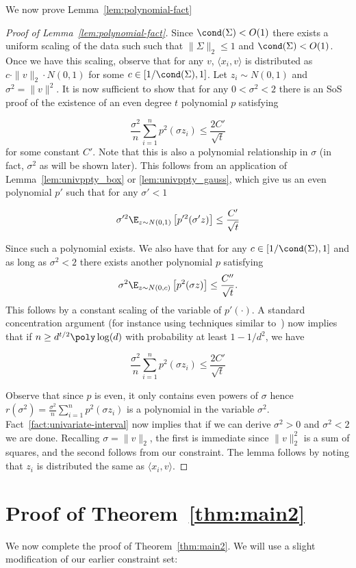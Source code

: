 We now prove Lemma~\ref{lem:polynomial-fact}
\begin{proof}[Proof of Lemma~\ref{lem:polynomial-fact}]
 Since $\cond(\Sigma) < O(1)$ there exists a uniform scaling of the data such such that $\|\Sigma\|_2 \leq 1$ and $\cond(\Sigma) < O(1)$. Once we have this scaling, observe that for any $v$, $\langle x_i, v\rangle$ is distributed as  $ c \cdot\|v\|_2 \cdot N(0, 1)$ for some $c \in [1/\cond(\Sigma), 1]$. Let $z_i \sim N(0,1)$ and $\sigma^2 = \|v\|^2$.  It is now  sufficient to show that for any $0 < \sigma^2 < 2$ there is an SoS proof of the existence of an even degree $t$ polynomial $p$ satisfying
 
 \[ \frac{\sigma^2}{n} \sum_{i=1}^n p^2(\sigma z_i) \leq \frac{2C'}{\sqrt{t}} \] 
for some constant $C'$. Note that this is also a polynomial relationship in $\sigma$ (in fact, $\sigma^2$ as will be shown later).  
This follows from an application of Lemma~\ref{lem:univppty_box} or \ref{lem:univppty_gauss}, which give us an even polynomial $p'$ such that for any $\sigma' < 1$

\[ \sigma'^2 \E_{z \sim N(0,1)} \left[ p'^2(\sigma' z) \right] \leq \frac{C'}{\sqrt{t}} \] 

Since such a polynomial exists. We also have that for any $c \in [1/\cond(\Sigma), 1]$ and as long as $\sigma^2 < 2$ there exists another polynomial $p$ satisfying 
\[ \sigma^2 \E_{z \sim N(0,c)} \left[ p^2(\sigma z) \right] \leq \frac{C''}{\sqrt{t}}. \] 
This follows by a constant scaling of the variable of $p'(\cdot)$. A standard concentration argument (for instance using techniques similar to~\cite{2017KS}) now implies that if $n \geq d^{t/2} \poly \log (d)$ with probability at least $1-1/d^2$, we have 

 \[ \frac{\sigma^2}{n} \sum_{i=1}^n p^2(\sigma z_i) \leq \frac{2C'}{\sqrt{t}} \] 

Observe that since $p$ is even, it only contains even powers of $\sigma$ hence $r(\sigma^2) =  \frac{\sigma^2}{n} \sum_{i=1}^n p^2(\sigma z_i)$ is a polynomial in the variable $\sigma^2$. Fact~\ref{fact:univariate-interval} now implies that if we can derive $\sigma^2 > 0$ and $\sigma^2 < 2$ we are done. Recalling $\sigma = \|v\|_2$, the first is immediate since $\|v\|_2^2$ is a sum of squares, and the second follows from our constraint. The lemma follows by noting that $z_i$ is distributed the same as $\langle x_i, v\rangle$.
\end{proof} 

\section{Proof of Theorem~\ref{thm:main2}}
We now complete the proof of Theorem~\ref{thm:main2}. We will use a slight modification of our earlier constraint set:

